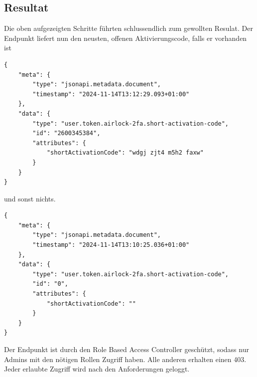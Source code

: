 \subsection{Resultat}
Die oben aufgezeigten Schritte führten schlussendlich zum gewollten Resulat. Der Endpunkt liefert nun den neusten, offenen Aktivierungscode, falls er vorhanden ist
\begin{verbatim}
{
	"meta": {
		"type": "jsonapi.metadata.document",
		"timestamp": "2024-11-14T13:12:29.093+01:00"
	},
	"data": {
		"type": "user.token.airlock-2fa.short-activation-code",
		"id": "2600345384",
		"attributes": {
			"shortActivationCode": "wdgj zjt4 m5h2 faxw"
		}
	}
}
\end{verbatim}
und sonst nichts.
\begin{verbatim}
{
	"meta": {
		"type": "jsonapi.metadata.document",
		"timestamp": "2024-11-14T13:10:25.036+01:00"
	},
	"data": {
		"type": "user.token.airlock-2fa.short-activation-code",
		"id": "0",
		"attributes": {
			"shortActivationCode": ""
		}
	}
}
\end{verbatim}
Der Endpunkt ist durch den Role Based Access Controller geschützt, sodass nur Admins mit den nötigen Rollen Zugriff haben. Alle anderen erhalten einen 403. Jeder erlaubte Zugriff wird nach den Anforderungen geloggt.
